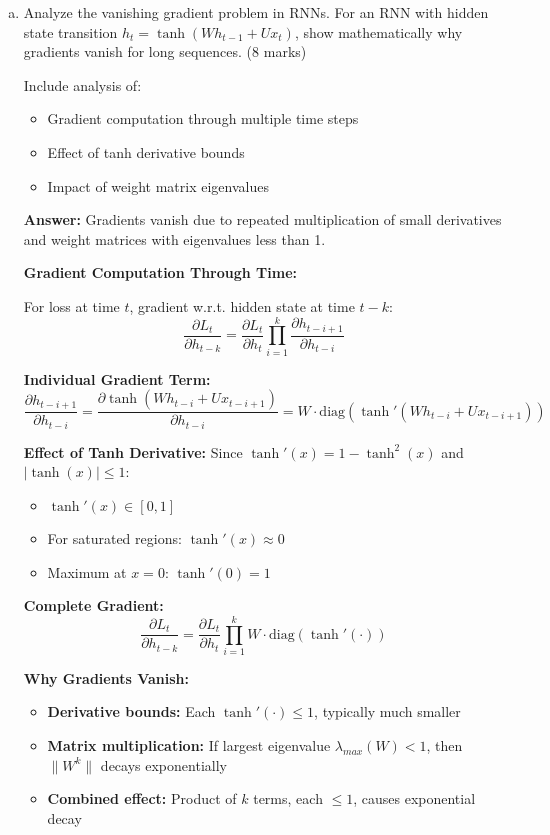 \documentclass[12pt]{article}
\newcommand{\answer}[1]{{\color{answercolor}\textbf{Answer:} #1}}
\newcommand{\explanation}[1]{{\color{explanationcolor}#1}}
\begin{document}
\begin{enumerate}[(a)]
    \item Analyze the vanishing gradient problem in RNNs. For an RNN with hidden state transition $h_t = \tanh(W h_{t-1} + U x_t)$, show mathematically why gradients vanish for long sequences. \hfill (8 marks)
    
    Include analysis of:
    \begin{itemize}
        \item Gradient computation through multiple time steps
        \item Effect of tanh derivative bounds
        \item Impact of weight matrix eigenvalues
    \end{itemize}
    
    \answer{Gradients vanish due to repeated multiplication of small derivatives and weight matrices with eigenvalues less than 1.}
    
    \explanation{
    \textbf{Gradient Computation Through Time:}
    
    For loss at time $t$, gradient w.r.t. hidden state at time $t-k$:
    $$\frac{\partial L_t}{\partial h_{t-k}} = \frac{\partial L_t}{\partial h_t} \prod_{i=1}^k \frac{\partial h_{t-i+1}}{\partial h_{t-i}}$$
    
    \textbf{Individual Gradient Term:}
    $$\frac{\partial h_{t-i+1}}{\partial h_{t-i}} = \frac{\partial \tanh(W h_{t-i} + U x_{t-i+1})}{\partial h_{t-i}} = W \cdot \text{diag}(\tanh'(W h_{t-i} + U x_{t-i+1}))$$
    
    \textbf{Effect of Tanh Derivative:}
    Since $\tanh'(x) = 1 - \tanh^2(x)$ and $|\tanh(x)| \leq 1$:
    \begin{itemize}
        \item $\tanh'(x) \in [0, 1]$
        \item For saturated regions: $\tanh'(x) \approx 0$
        \item Maximum at $x = 0$: $\tanh'(0) = 1$
    \end{itemize}
    
    \textbf{Complete Gradient:}
    $$\frac{\partial L_t}{\partial h_{t-k}} = \frac{\partial L_t}{\partial h_t} \prod_{i=1}^k W \cdot \text{diag}(\tanh'(\cdot))$$
    
    \textbf{Why Gradients Vanish:}
    \begin{itemize}
        \item \textbf{Derivative bounds:} Each $\tanh'(\cdot) \leq 1$, typically much smaller
        \item \textbf{Matrix multiplication:} If largest eigenvalue $\lambda_{max}(W) < 1$, then $\|W^k\|$ decays exponentially
        \item \textbf{Combined effect:} Product of $k$ terms, each $\leq 1$, causes exponential decay
    \end{itemize}
    
}
\end{enumerate}
\end{document}
